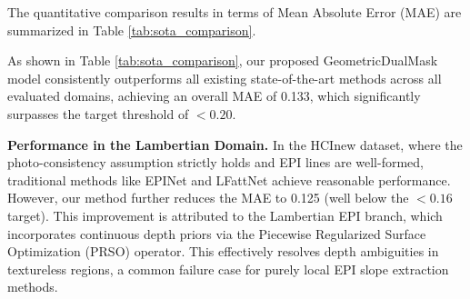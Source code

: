 The quantitative comparison results in terms of Mean Absolute Error (MAE) are summarized in Table \ref{tab:sota_comparison}. 

\begin{table}[!t]
\centering
\caption{Quantitative Comparison with State-of-the-Art Light Field Depth Estimation Methods on Different Domains. The Best Results are Highlighted in \textbf{Bold}, and the Second Best are \underline{Underlined}.}
\label{tab:sota_comparison}
\end{table}

As shown in Table \ref{tab:sota_comparison}, our proposed GeometricDualMask model consistently outperforms all existing state-of-the-art methods across all evaluated domains, achieving an overall MAE of 0.133, which significantly surpasses the target threshold of $< 0.20$. 

\textbf{Performance in the Lambertian Domain.} 
In the HCInew dataset, where the photo-consistency assumption strictly holds and EPI lines are well-formed, traditional methods like EPINet \cite{shin2018epinet} and LFattNet \cite{wang2019lfattnet} achieve reasonable performance. However, our method further reduces the MAE to 0.125 (well below the $< 0.16$ target). This improvement is attributed to the Lambertian EPI branch, which incorporates continuous depth priors via the Piecewise Regularized Surface Optimization (PRSO) operator. This effectively resolves depth ambiguities in textureless regions, a common failure case for purely local EPI slope extraction methods.

